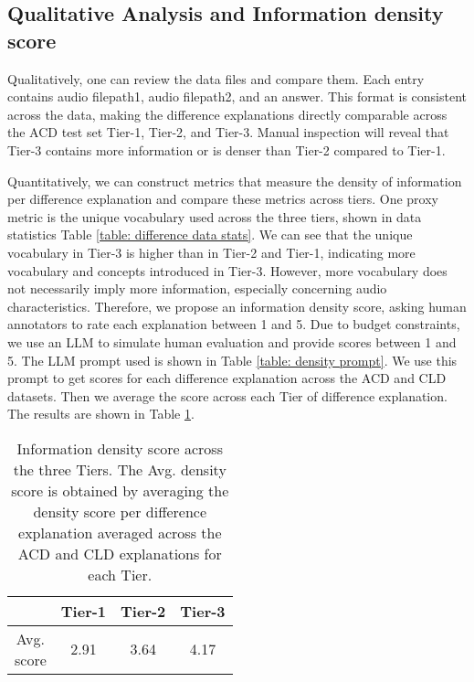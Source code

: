 \subsection{Qualitative Analysis and Information density score} \label{appendix: information density score}
Qualitatively, one can review the data files and compare them. Each entry contains audio filepath1, audio filepath2, and an answer. This format is consistent across the data, making the difference explanations directly comparable across the ACD test set Tier-1, Tier-2, and Tier-3. Manual inspection will reveal that Tier-3 contains more information or is denser than Tier-2 compared to Tier-1. 

Quantitatively, we can construct metrics that measure the density of information per difference explanation and compare these metrics across tiers. One proxy metric is the unique vocabulary used across the three tiers, shown in data statistics Table \ref{table: difference data stats}. We can see that the unique vocabulary in Tier-3 is higher than in Tier-2 and Tier-1, indicating more vocabulary and concepts introduced in Tier-3. However, more vocabulary does not necessarily imply more information, especially concerning audio characteristics. Therefore, we propose an information density score, asking human annotators to rate each explanation between 1 and 5. Due to budget constraints, we use an LLM to simulate human evaluation and provide scores between 1 and 5. The LLM prompt used is shown in Table \ref{table: density prompt}. We use this prompt to get scores for each difference explanation across the ACD and CLD datasets. Then we average the score across each Tier of difference explanation. The results are shown in Table \ref{table: information density results}.  

\begin{table}[!ht]
\scriptsize
\center
\begin{tabular}{c|ccc} \toprule
& Tier-1 & Tier-2 & Tier-3 \\
\midrule
\makecell{Avg. \\ score} & 2.91 & 3.64 & 4.17 \\
\bottomrule
\end{tabular}
\caption{\small Information density score across the three Tiers. The Avg. density score is obtained by averaging the density score per difference explanation averaged across the ACD and CLD explanations for each Tier. } \label{table: information density results} \vspace{-0.1in}
\end{table}

